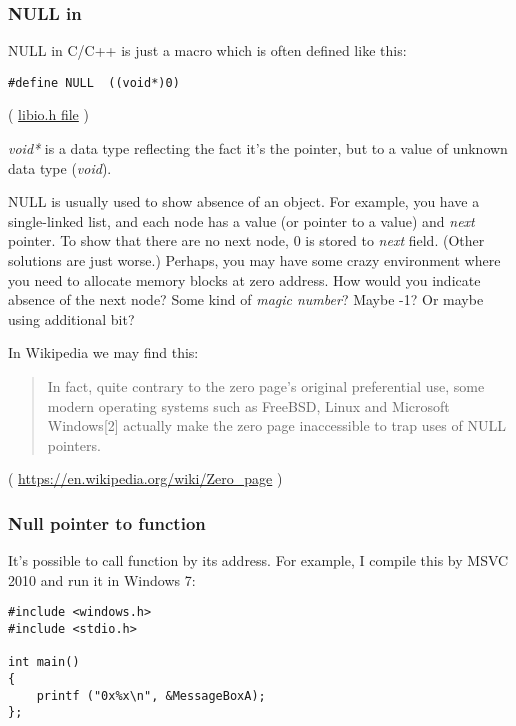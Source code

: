 \subsubsection{NULL in \CCpp}

NULL in C/C++ is just a macro which is often defined like this:

\begin{lstlisting}[style=customc]
#define NULL  ((void*)0)
\end{lstlisting}
( \href{https://github.com/wzhy90/linaro_toolchains/blob/8ff8ae680bac04558d10cc9626e12c4c2f6c1348/arm-cortex_a15-linux-gnueabihf/libc/usr/include/libio.h#L70}{libio.h file} )

\emph{void*} is a data type reflecting the fact it's the pointer, but to a value of unknown data type (\emph{void}).

NULL is usually used to show absence of an object.
For example, you have a single-linked list, and each node has a value (or pointer to a value) and \emph{next} pointer.
To show that there are no next node, 0 is stored to \emph{next} field.
(Other solutions are just worse.)
Perhaps, you may have some crazy environment where you need to allocate memory blocks at zero address. How would you indicate absence of the next node?
Some kind of \emph{magic number}? Maybe -1? Or maybe using additional bit?

In Wikipedia we may find this:

\begin{framed}
\begin{quotation}
In fact, quite contrary to the zero page's original preferential use, some modern operating systems such as FreeBSD, Linux and Microsoft Windows[2] actually make the zero page inaccessible to trap uses of NULL pointers. 
\end{quotation}
\end{framed}
( \url{https://en.wikipedia.org/wiki/Zero_page} )

\subsubsection{Null pointer to function}

It's possible to call function by its address.
For example, I compile this by MSVC 2010 and run it in Windows 7:

\begin{lstlisting}[style=customc]
#include <windows.h>
#include <stdio.h>

int main()
{
	printf ("0x%x\n", &MessageBoxA);
};
\end{lstlisting}

